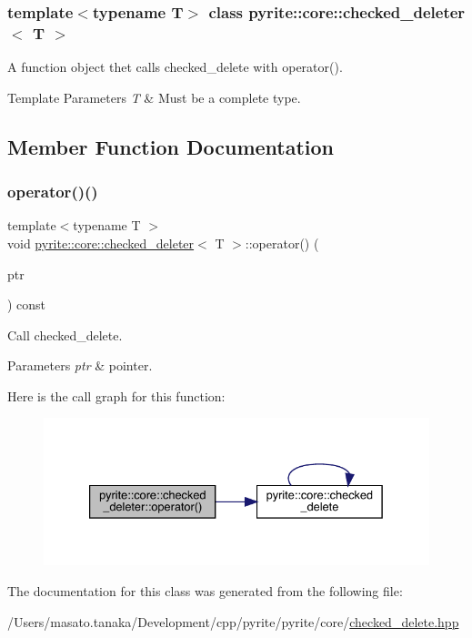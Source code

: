 \subsubsection*{template$<$typename T$>$\newline
class pyrite\+::core\+::checked\+\_\+deleter$<$ T $>$}

A function object thet calls checked\+\_\+delete with operator(). 
\begin{DoxyTemplParams}{Template Parameters}
{\em T} & Must be a complete type. \\
\hline
\end{DoxyTemplParams}


\subsection{Member Function Documentation}
\mbox{\label{classpyrite_1_1core_1_1checked__deleter_a214d518516d6f75bb36b941e4f345f6d}} 
\subsubsection{\texorpdfstring{operator()()}{operator()()}}
{\footnotesize\ttfamily template$<$typename T $>$ \\
void \mbox{\hyperlink{classpyrite_1_1core_1_1checked__deleter}{pyrite\+::core\+::checked\+\_\+deleter}}$<$ T $>$\+::operator() (\begin{DoxyParamCaption}\item[{T $\ast$\&}]{ptr }\end{DoxyParamCaption}) const\hspace{0.3cm}{\ttfamily [inline]}}

Call checked\+\_\+delete. 
\begin{DoxyParams}{Parameters}
{\em ptr} & pointer. \\
\hline
\end{DoxyParams}
Here is the call graph for this function\+:
\nopagebreak
\begin{figure}[H]
\begin{center}
\leavevmode
\includegraphics[width=333pt]{dc/d24/classpyrite_1_1core_1_1checked__deleter_a214d518516d6f75bb36b941e4f345f6d_cgraph}
\end{center}
\end{figure}


The documentation for this class was generated from the following file\+:\begin{DoxyCompactItemize}
\item 
/\+Users/masato.\+tanaka/\+Development/cpp/pyrite/pyrite/core/\mbox{\hyperlink{checked__delete_8hpp}{checked\+\_\+delete.\+hpp}}\end{DoxyCompactItemize}
